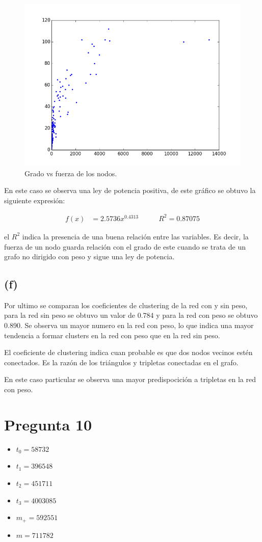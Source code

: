 \documentclass[letterpaper]{article}
\begin{document}
\begin{figure}[H]
  \centering
  \includegraphics[width=.75\linewidth]{img/p9-k-vs-s.png}
  \caption{Grado vs fuerza de los nodos.}
  \label{chart:4}
\end{figure}

En este caso se observa una ley de potencia positiva, de este gráfico se obtuvo la siguiente expresión:

\begin{align}
f(x) &= 2.5736x^{0.4313} & \qquad R^{2} = 0.87075
\end{align}

el $R^2$ indica la presencia de una buena relación entre las variables. Es decir, la fuerza de un nodo guarda relación con el grado de este cuando se trata de un grafo no dirigido con peso y sigue una ley de potencia.

\subsection*{(f)}

Por ultimo se comparan los coeficientes de clustering de la red con y sin peso, para la red sin peso se obtuvo un valor de 0.784 y para la red con peso se obtuvo 0.890. Se observa un mayor numero en la red con peso, lo que indica una mayor tendencia a formar clusters en la red con peso que en la red sin peso.

El coeficiente de clustering indica cuan probable es que dos nodos vecinos estén conectados. Es la razón de los triángulos y tripletas conectadas en el grafo.

En este caso particular se observa una mayor predispocición a tripletas en la red con peso.

\section{Pregunta 10}
\begin{itemize}
  \item $t_0 = 58732$
  \item $t_1 = 396548$
  \item $t_2 = 451711$
  \item $t_3 = 4003085$
  \item $m_+ = 592551$
  \item $m   = 711782$
\end{itemize}
\end{document}
